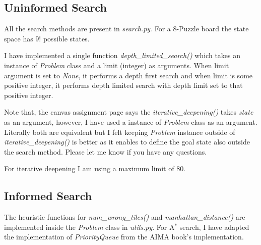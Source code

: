 \subsection*{Uninformed Search}
All the search methods are present in \textit{search.py}. For a 8-Puzzle board the state space has $9!$ possible states.

I have implemented a single function \textit{depth\_limited\_search()} which takes an instance of \textit{Problem} class and a limit (integer) as arguments. When limit argument is set to \textit{None}, it performs a depth first search and when limit is some positive integer, it performs depth limited search with depth limit set to that positive integer.

Note that, the canvas assignment page says the \textit{iterative\_deepening()} takes \textit{state} as an argument, however, I have used a instance of \textit{Problem} class as an argument. Literally both are equivalent but I felt keeping \textit{Problem} instance outside of \textit{iterative\_deepening()} is better as it enables to define the goal state also outside the search method. Please let me know if you have any questions.

For iterative deepening I am using a maximum limit of $80$.
\subsection*{Informed Search}
The heuristic functions for \textit{num\_wrong\_tiles()} and \textit{manhattan\_distance()} are implemented inside the \textit{Problem} class in \textit{utils.py}. For A$^*$ search, I have adapted the implementation of \textit{PriorityQueue} from the AIMA book's implementation.